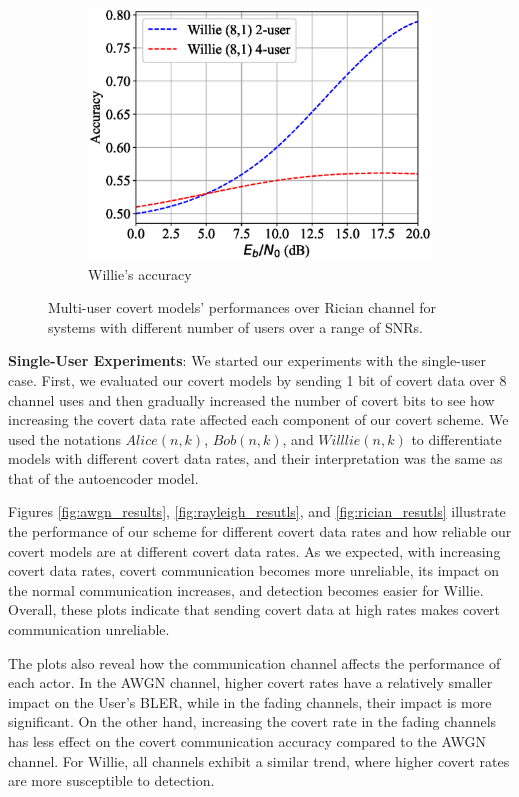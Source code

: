 \begin{figure}[tp!]
\begin{subfigure}{0.28\textwidth}
		\includegraphics[width=\linewidth]{figs/multi_willie_accuracy_rician}
		\caption{Willie's accuracy}
		\label{fig:multi_rician_results_willie}
	\end{subfigure}
	\caption{Multi-user covert models' performances over Rician channel for systems with different number of users over a range of SNRs.}
	\label{fig:multi_rician_results}
\end{figure}

\textbf{Single-User Experiments}: 
We started our experiments with the single-user case. First, we evaluated our covert models by sending 1 bit of covert data over 8 channel uses and then gradually increased the number of covert bits to see how increasing the covert data rate affected each component of our covert scheme. We used the notations \(Alice (n,k)\), \(Bob (n,k)\), and \(Willlie (n,k)\) to differentiate models with different covert data rates, and their interpretation was the same as that of the autoencoder model.

Figures \ref{fig:awgn_results}, \ref{fig:rayleigh_resutls}, and \ref{fig:rician_resutls} illustrate the performance of our scheme for different covert data rates and how reliable our covert models are at different covert data rates. As we expected, with increasing covert data rates, covert communication becomes more unreliable, its impact on the normal communication increases, and detection becomes easier for Willie. Overall, these plots indicate that sending covert data at high rates makes covert communication unreliable.

The plots also reveal how the communication channel affects the performance of each actor. In the AWGN channel, higher covert rates have a relatively smaller impact on the User's BLER, while in the fading channels, their impact is more significant. On the other hand, increasing the covert rate in the fading channels has less effect on the covert communication accuracy compared to the AWGN channel. For Willie, all channels exhibit a similar trend, where higher covert rates are more susceptible to detection.

